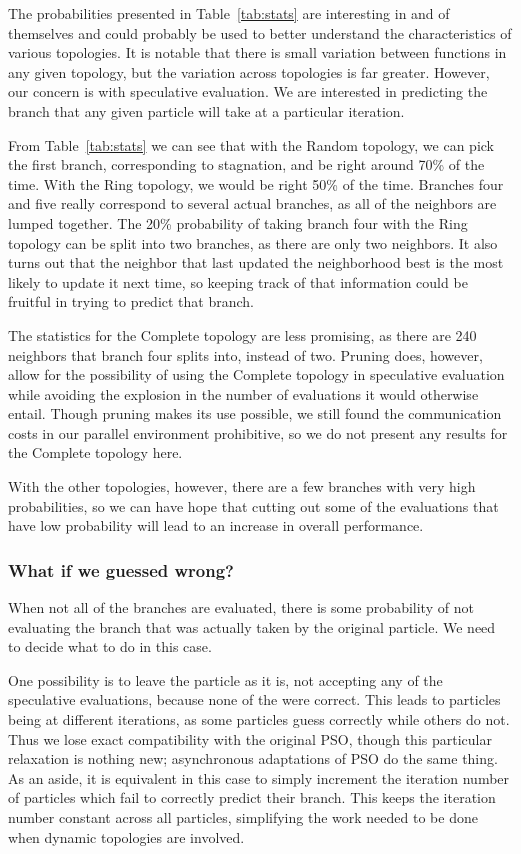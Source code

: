 \documentclass[journal,letterpaper]{IEEEtran}
\begin{document}
The probabilities presented in Table~\ref{tab:stats} are interesting in and of
themselves and could probably be used to better understand the characteristics
of various topologies.  It is notable that there is small variation between
functions in any given topology, but the variation across topologies is far
greater.  However, our concern is with speculative evaluation.  We are
interested in predicting the branch that any given particle will take at a
particular iteration.

From Table~\ref{tab:stats} we can see that with the Random topology, we can
pick the first branch, corresponding to stagnation, and be right around 70\% of
the time.  With the Ring topology, we would be right 50\% of the time.
Branches four and five really correspond to several actual branches, as all of
the neighbors are lumped together.  The 20\% probability of taking branch four
with the Ring topology can be split into two branches, as there are only two
neighbors.  It also turns out that the neighbor that last updated the
neighborhood best is the most likely to update it next time, so keeping track
of that information could be fruitful in trying to predict that branch.

The statistics for the Complete topology are less promising, as there are 240
neighbors that branch four splits into, instead of two.  Pruning does, however,
allow for the possibility of using the Complete topology in speculative
evaluation while avoiding the explosion in the number of evaluations it would
otherwise entail.  Though pruning makes its use possible, we still found the
communication costs in our parallel environment prohibitive, so we do not
present any results for the Complete topology here.

With the other topologies, however, there are a few branches with very high
probabilities, so we can have hope that cutting out some of the evaluations
that have low probability will lead to an increase in overall performance.

\subsubsection{What if we guessed wrong?}

When not all of the branches are evaluated, there is some probability of not
evaluating the branch that was actually taken by the original particle.  We 
need to decide what to do in this case.  

One possibility is to leave the particle as it is, not accepting any of the
speculative evaluations, because none of the were correct.  This leads to
particles being at different iterations, as some particles guess correctly
while others do not.  Thus we lose exact compatibility with the original PSO,
though this particular relaxation is nothing new; asynchronous adaptations of
PSO do the same thing.  As an aside, it is equivalent in this case to simply
increment the iteration number of particles which fail to correctly predict
their branch.  This keeps the iteration number constant across all particles,
simplifying the work needed to be done when dynamic topologies are involved.
\end{document}
